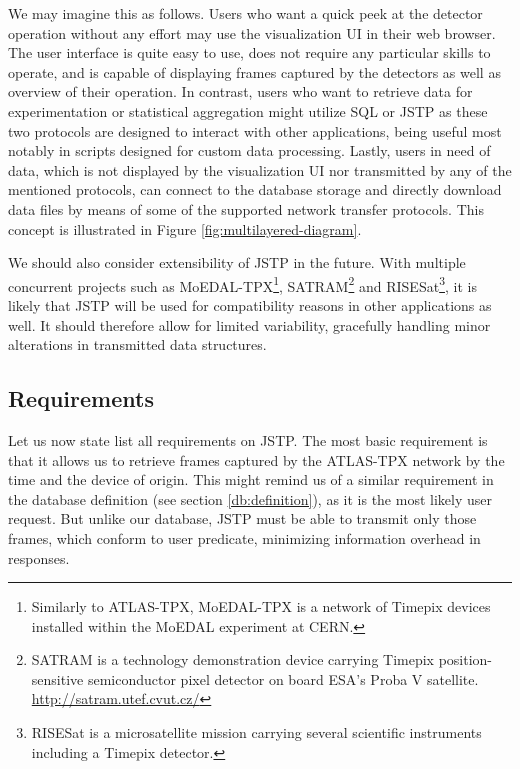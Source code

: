 We may imagine this as follows. Users who want a quick peek at the detector operation without any effort may use the visualization UI in their web browser. The user interface is quite easy to use, does not require any particular skills to operate, and is capable of displaying frames captured by the detectors as well as overview of their operation. In contrast, users who want to retrieve data for experimentation or statistical aggregation might utilize SQL or JSTP as these two protocols are designed to interact with other applications, being useful most notably in scripts designed for custom data processing. Lastly, users in need of data, which is not displayed by the visualization UI nor transmitted by any of the mentioned protocols, can connect to the database storage and directly download data files by means of some of the supported network transfer protocols. This concept is illustrated in Figure \ref{fig:multilayered-diagram}.

We should also consider extensibility of JSTP in the future. With multiple concurrent projects such as MoEDAL-TPX\footnote{Similarly to ATLAS-TPX, MoEDAL-TPX is a network of Timepix devices installed within the MoEDAL experiment at CERN.}, SATRAM\footnote{SATRAM is a technology demonstration device carrying Timepix position-sensitive semiconductor pixel detector on board ESA’s Proba V satellite. \url{http://satram.utef.cvut.cz/}} and RISESat\footnote{RISESat is a microsatellite mission carrying several scientific instruments including a Timepix detector.}, it is likely that JSTP will be used for compatibility reasons in other applications as well. It should therefore allow for limited variability, gracefully handling minor alterations in transmitted data structures.

\subsection{Requirements}
Let us now state list all requirements on JSTP. The most basic requirement is that it allows us to retrieve frames captured by the ATLAS-TPX network by the time and the device of origin. This might remind us of a similar requirement in the database definition (see section \ref{db:definition}), as it is the most likely user request. But unlike our database, JSTP must be able to transmit only those frames, which conform to user predicate, minimizing information overhead in responses.

